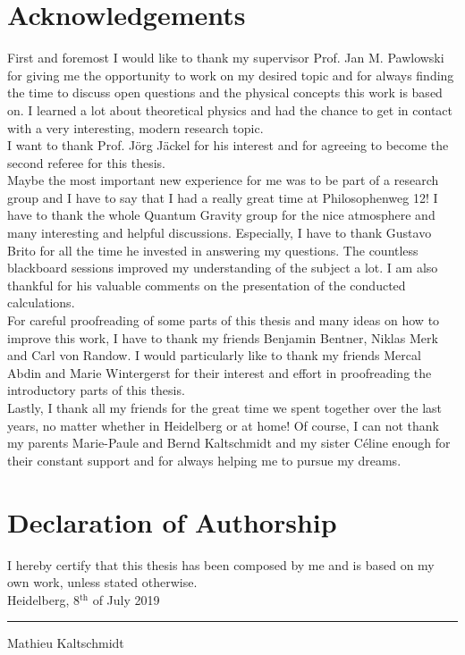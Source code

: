\thispagestyle{plain}
\section*{Acknowledgements}
First and foremost I would like to thank my supervisor Prof. Jan M. Pawlowski for giving me the opportunity to work on my desired topic and for always finding the time to discuss open questions and the physical concepts this work is based on. I learned a lot about theoretical physics and had the chance to get in contact with a very interesting, modern research topic.\\
I want to thank Prof. J\"org J\"ackel for his interest and for agreeing to become the second referee for this thesis.\\
Maybe the most important new experience for me was to be part of a research group and I have to say that I had a really great time at Philosophenweg 12! I have to thank the whole Quantum Gravity group for the nice atmosphere and many interesting and helpful discussions. Especially, I have to thank Gustavo Brito for all the time he invested in answering my questions. The countless blackboard sessions improved my understanding of the subject a lot. I am also thankful for his valuable comments on the presentation of the conducted calculations.\\
For careful proofreading of some parts of this thesis and many ideas on how to improve this work, I have to thank my friends Benjamin Bentner, Niklas Merk and Carl von Randow. I would particularly like to thank my friends Mercal Abdin and Marie Wintergerst for their interest and effort in proofreading the introductory parts of this thesis. \\
Lastly, I thank all my friends for the great time we spent together over the last years, no matter whether in Heidelberg or at home! Of course, I can not thank my parents Marie-Paule and Bernd Kaltschmidt and my sister C\'{e}line enough for their constant support and for always helping me to pursue my dreams.  
 
\vfill
\section*{Declaration of Authorship}
I hereby certify that this thesis has been composed by me and is based on my own work, unless stated otherwise.\\

Heidelberg, 8$^{\mathrm{th}}$ of July 2019 \hfill \rule{60mm}{.15mm} \par \vspace{-0.4cm}
\hfill Mathieu Kaltschmidt
\vfill

